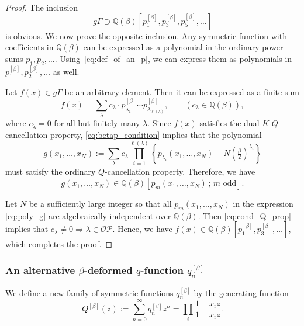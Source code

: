 \documentclass[dvipdfmx]{amsart}
\theoremstyle{definition}
\theoremstyle{remark}
\begin{document}
\begin{proof}
The inclusion 
\[
g\Gamma \supset \mathbb{Q}(\beta)[p_1^{[\beta]}, p_3^{[\beta]}, p_5^{[\beta]}, \dots]
\]
is obvious. We now prove the opposite inclusion.
Any symmetric function with coefficients in \( \mathbb{Q}(\beta) \) can be expressed as a polynomial in the ordinary power sums \( p_1, p_2, \dots \).  
Using~\eqref{eq:def_of_an_p}, we can express them as polynomials in \( p_1^{[\beta]}, p_2^{[\beta]}, \dots \) as well.

Let \( f(x) \in g\Gamma \) be an arbitrary element. Then it can be expressed as a finite sum
\begin{equation}\label{eq:exp_of_f}
f(x) = \sum_\lambda c_\lambda \cdot 
p_{\lambda_1}^{[\beta]} \cdots p_{\lambda_{\ell(\lambda)}}^{[\beta]},
\qquad (c_\lambda \in \mathbb{Q}(\beta)),
\end{equation}
where \( c_\lambda = 0 \) for all but finitely many \( \lambda \).
Since \( f(x) \) satisfies the dual \( K \)-\( Q \)-cancellation property, \eqref{eq:betap_condition} implies that the polynomial
\begin{equation}\label{eq:poly_g}
g(x_1, \dots, x_N) := 
\sum_\lambda c_\lambda \prod_{i=1}^{\ell(\lambda)} 
\left\{ p_{\lambda_i}(x_1, \dots, x_N) - N\left( \tfrac{\beta}{2} \right)^{\lambda_i} \right\}
\end{equation}
must satisfy the ordinary \( Q \)-cancellation property.  
Therefore, we have
\begin{equation}\label{eq:cond_Q_prop}
g(x_1, \dots, x_N) \in \mathbb{Q}(\beta)[p_m(x_1, \dots, x_N)\,;\, m \text{ odd}].
\end{equation}

Let $N$ be a sufficiently large integer so that all $p_{m}(x_1,\dots,x_N)$ in the expression \eqref{eq:poly_g} are  algebraically independent over \( \mathbb{Q}(\beta) \).  
Then \eqref{eq:cond_Q_prop} implies that \( c_\lambda \neq 0 \Rightarrow \lambda \in \mathcal{OP} \).
Hence, we have \( f(x) \in \mathbb{Q}(\beta)[p_1^{[\beta]}, p_3^{[\beta]}, \dots] \), which completes the proof.
\end{proof}

\subsubsection{An alternative \( \beta \)-deformed \( q \)-function \( q_n^{[\beta]} \)}

We define a new family of symmetric functions \( q_n^{[\beta]} \) by the generating function
\begin{equation}\label{eq:Q}
Q^{[\beta]}(z) := \sum_{n=0}^\infty q_n^{[\beta]} z^n
= \prod_i \frac{1 - x_i \overline{z}}{1 - x_i z}.
\end{equation}
\end{document}
